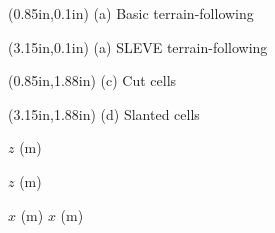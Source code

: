 \documentclass{article}
\begin{document}
\TPMargin{2pt}
\begin{textblock*}{12em}(0.85in,0.1in)
\normalsize
{}
(a) Basic terrain-following
\end{textblock*}
\begin{textblock*}{12em}(3.15in,0.1in)
\normalsize
{}
(a) SLEVE terrain-following
\end{textblock*}
\begin{textblock*}{6em}(0.85in,1.88in)
\normalsize
{}
(c) Cut cells
\end{textblock*}
\begin{textblock*}{7em}(3.15in,1.88in)
\normalsize
{}
(d) Slanted cells
\end{textblock*}

$z$ (\si{\meter}) 

$z$ (\si{\meter}) 

\vspace{0.5em}
\hspace*{13em}$x$ (\si{\meter}) \hspace*{14em} $x$ (\si{\meter})
\end{document}
